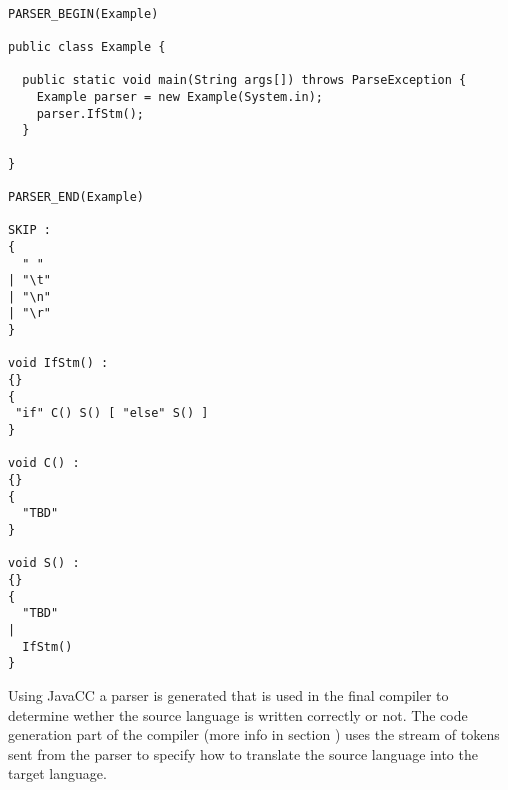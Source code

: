 \begin{lstlisting}[captionpos=b, caption={One of JavaCC's standart examples on how to make a grammar that accepts ``if''-statements.}, label=lst:javacc-grammar-example]

PARSER_BEGIN(Example)

public class Example {

  public static void main(String args[]) throws ParseException {
    Example parser = new Example(System.in);
    parser.IfStm();
  }

}

PARSER_END(Example)

SKIP :
{
  " "
| "\t"
| "\n"
| "\r"
}

void IfStm() :
{}
{
 "if" C() S() [ "else" S() ]
}

void C() :
{}
{
  "TBD"
}

void S() :
{}
{
  "TBD"
|
  IfStm()
}
\end{lstlisting}

Using JavaCC a parser is generated that is used in the final compiler to determine wether the source language is written correctly or not. The code generation part of the compiler (more info in section ) uses the stream of tokens sent from the parser to specify how to translate the source language into the target language. 